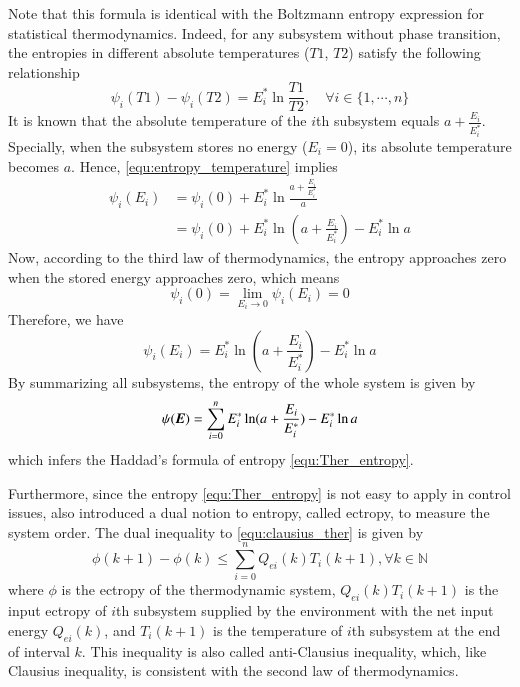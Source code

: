 \documentclass[preprint,authoryear,12pt]{elsarticle}
\renewcommand{\vec}[1]{\mbox{\boldmath$#1$}}
\begin{document}
Note that this formula is identical with the Boltzmann entropy
expression for statistical thermodynamics. Indeed, for any subsystem
without phase transition, the entropies in different absolute
temperatures ($T1$, $T2$) satisfy the following relationship
\citep{cengel_thermodynamics:_2001}
\begin{equation}\label{equ:entropy_temperature}
\psi_i(T1)-\psi_i(T2)=E_i^* \ln \frac{T1}{T2},\quad \forall
i\in\{1,\cdots,n\}
\end{equation}
It is known that the absolute temperature of the $i$th subsystem
equals $a+\frac{E_i}{E_i^*}$. Specially, when the subsystem stores no
energy ($E_i=0$), its absolute temperature becomes $a$. Hence,
\eqref{equ:entropy_temperature} implies
\begin{align}
\psi_i(E_i)&=\psi_i(0)+E_i^* \ln \frac{a+\frac{E_i}{E_i^*}}{a}
\nonumber\\
&=\psi_i(0)+E_i^* \ln (a+\frac{E_i}{E_i^*})-E_i^* \ln{a}
\label{equ:tmp_psi_1}
\end{align}
Now, according to the third law of thermodynamics, the entropy
approaches zero when the stored energy approaches zero, which means
\begin{equation}\label{equ:entropy_zero}
\psi_i(0)=\lim_{E_i\rightarrow 0}\psi_i(E_i)=0
\end{equation}
Therefore, we have
\begin{equation}
\psi_i(E_i)=E_i^* \ln (a+\frac{E_i}{E_i^*})-E_i^* \ln{a}
\end{equation}
By summarizing all subsystems, the entropy of the whole system is
given by
\begin{equation}
\psi(\vec{E})=\sum_{i=0}^n E_i^*\ln(a+\frac{E_i}{E_i^*})-E_i^*\ln a
\end{equation}
which infers the Haddad's formula of entropy
\eqref{equ:Ther_entropy}.

Furthermore, since the entropy \eqref{equ:Ther_entropy} is not easy
to apply in control issues, \citet{haddad_thermodynamic_2005} also
introduced a dual notion to entropy, called ectropy, to measure the
system order. The dual inequality to \eqref{equ:clausius_ther} is
given by
\begin{equation}\label{equ:anti_clausius}
\phi(k+1)-\phi(k)\le \sum_{i=0}^n Q_{ei}(k)T_i(k+1),
\forall k\in\mathbb{N}
\end{equation}
where $\phi$ is the ectropy of the thermodynamic system,
$Q_{ei}(k)T_i(k+1)$ is the input ectropy of $i$th subsystem supplied
by the environment with the net input energy $Q_{ei}(k)$, and
$T_i(k+1)$ is the temperature of $i$th subsystem at the end of
interval $k$. This inequality is also called anti-Clausius
inequality, which, like Clausius inequality, is consistent with the
second law of thermodynamics.
\end{document}
